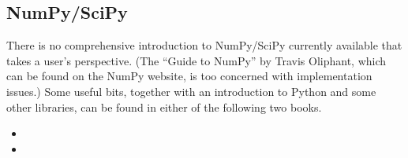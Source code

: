 \subsection{NumPy/SciPy}

There is no comprehensive introduction to NumPy/SciPy currently
available that takes a user's perspective.  (The ``Guide to NumPy'' by
Travis Oliphant, which can be found on the NumPy website, is too
concerned with implementation issues.) Some useful bits, together with
an introduction to Python and some other libraries, can be found in
either of the following two books.
\begin{itemize}
\item {}

\item {}
\end{itemize}
\clearpage
\
\thispagestyle{empty}
\
\clearpage
